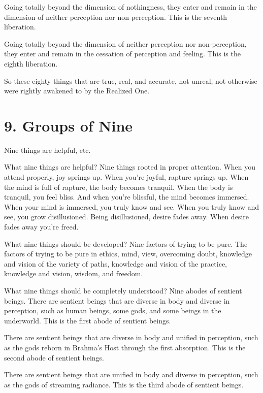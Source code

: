 \documentclass[12pt,openany]{book}%
\begin{document}
Going totally beyond the dimension of nothingness, they enter and remain in the dimension of neither perception nor non-perception. This is the seventh liberation. 

Going totally beyond the dimension of neither perception nor non-perception, they enter and remain in the cessation of perception and feeling. This is the eighth liberation. 

So these eighty things that are true, real, and accurate, not unreal, not otherwise were rightly awakened to by the Realized One. 

\section*{9. Groups of Nine }

Nine things are helpful, etc. 

What nine things are helpful? Nine things rooted in proper attention. When you attend properly, joy springs up. When you’re joyful, rapture springs up. When the mind is full of rapture, the body becomes tranquil. When the body is tranquil, you feel bliss. And when you’re blissful, the mind becomes immersed. When your mind is immersed, you truly know and see. When you truly know and see, you grow disillusioned. Being disillusioned, desire fades away. When desire fades away you’re freed. 

What nine things should be developed? Nine factors of trying to be pure. The factors of trying to be pure in ethics, mind, view, overcoming doubt, knowledge and vision of the variety of paths, knowledge and vision of the practice, knowledge and vision, wisdom, and freedom. 

What nine things should be completely understood? Nine abodes of sentient beings. There are sentient beings that are diverse in body and diverse in perception, such as human beings, some gods, and some beings in the underworld. This is the first abode of sentient beings. 

There are sentient beings that are diverse in body and unified in perception, such as the gods reborn in \textsanskrit{Brahmā}’s Host through the first absorption. This is the second abode of sentient beings. 

There are sentient beings that are unified in body and diverse in perception, such as the gods of streaming radiance. This is the third abode of sentient beings. 
\end{document}
